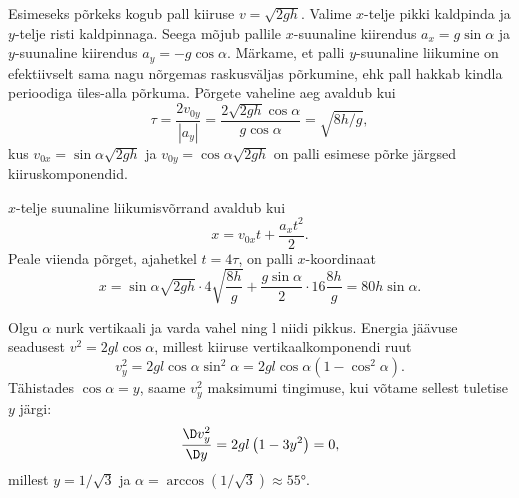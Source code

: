 \documentclass[10pt]{article}
\begin{document}
{
\solu
Esimeseks põrkeks kogub pall kiiruse $v = \sqrt{2gh}$. Valime $x$-telje pikki kaldpinda ja $y$-telje risti kaldpinnaga. Seega mõjub pallile $x$-suunaline kiirendus $a_x = g\sin\alpha$ ja $y$-suunaline kiirendus $a_y = -g\cos\alpha$. Märkame, et palli $y$-suunaline liikumine on efektiivselt sama nagu nõrgemas raskusväljas põrkumine, ehk pall hakkab kindla perioodiga üles-alla põrkuma. Põrgete vaheline aeg avaldub kui 
\[
\tau = \frac{2v_{0y}}{|a_y|} = \frac{2 \sqrt{2 g h} \cos \alpha}{g \cos \alpha} = \sqrt{8h/g},
\]
kus $v_{0x} = \sin\alpha\sqrt{2gh}$ ja $v_{0y}=\cos\alpha\sqrt{2gh}$ on palli esimese põrke järgsed kiiruskomponendid.

$x$-telje suunaline liikumisvõrrand avaldub kui
\[
x = v_{0x}t + \frac{a_xt^2}{2}.
\]
Peale viienda põrget, ajahetkel $t = 4\tau$, on palli $x$-koordinaat
\[
x = \sin\alpha\sqrt{2gh}\cdot 4\sqrt{\frac{8h}{g}} + \frac{g\sin\alpha}{2}\cdot 16\frac{8h}{g} = 80h\sin\alpha.
\]
\probend
\bigskip


\solu
Olgu $\alpha$ nurk vertikaali ja varda vahel ning l niidi pikkus. Energia jäävuse seadusest
$v^2 = 2gl \cos \alpha$, millest kiiruse vertikaalkomponendi ruut
\[
v_{y}^{2}=2 g l \cos \alpha \sin ^{2} \alpha=2 g l \cos \alpha\left(1-\cos ^{2} \alpha\right).
\]
Tähistades $\cos \alpha = y$, saame $v_y^2$ maksimumi tingimuse, kui võtame sellest tuletise $y$ järgi:
\[
\frac{\D v_{y}^{2}}{\D y}=2 g l\left( 1-3 y^{2}\right)=0,
\]
millest $y = 1/ \sqrt 3$ ja $\alpha = \arccos \left( 1/ \sqrt 3\right) \approx \ang{55}$.

\vspace{0.5\baselineskip}

}
\end{document}
